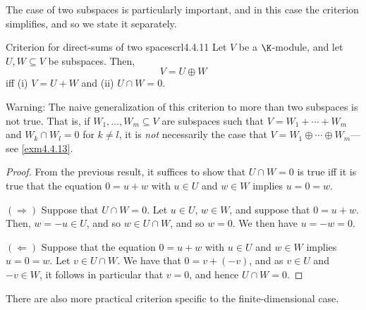 The case of two subspaces is particularly important, and in this case the criterion simplifies, and so we state it separately.
\begin{crl}{Criterion for direct-sums of two spaces}{crl4.4.11}
	Let $V$ be a $\K$-module, and let $U,W\subseteq V$ be subspaces.  Then,
	\begin{equation}
		V=U\oplus W
	\end{equation}
	iff (i) $V=U+W$ and (ii) $U\cap W=0$.
	\begin{rmk}
		Warning:  The naive generalization of this criterion to more than two subspaces is not true.  That is, if $W_1,\ldots ,W_m\subseteq V$ are subspaces such that $V=W_1+\cdots +W_m$ and $W_k\cap W_l=0$ for $k\neq l$, it is \emph{not} necessarily the case that $V=W_1\oplus \cdots \oplus W_m$---see \cref{exm4.4.13}.
	\end{rmk}
	\begin{proof}
		From the previous result, it suffices to show that $U\cap W=0$ is true iff it is true that the equation $0=u+w$ with $u\in U$ and $w\in W$ implies $u=0=w$.
		
		\blni
		$(\Rightarrow )$ Suppose that $U\cap W=0$.  Let $u\in U$, $w\in W$, and suppose that $0=u+w$.  Then, $w=-u\in U$, and so $w\in U\cap W$, and so $w=0$.  We then have $u=-w=0$.
		
		\blni
		$(\Leftarrow )$ Suppose that the equation $0=u+w$ with $u\in U$ and $w\in W$ implies $u=0=w$.  Let $v\in U\cap W$.  We have that $0=v+(-v)$, and as $v\in U$ and $-v\in W$, it follows in particular that $v=0$, and hence $U\cap W=0$.
	\end{proof}
\end{crl}
There are also more practical criterion specific to the finite-dimensional case.
